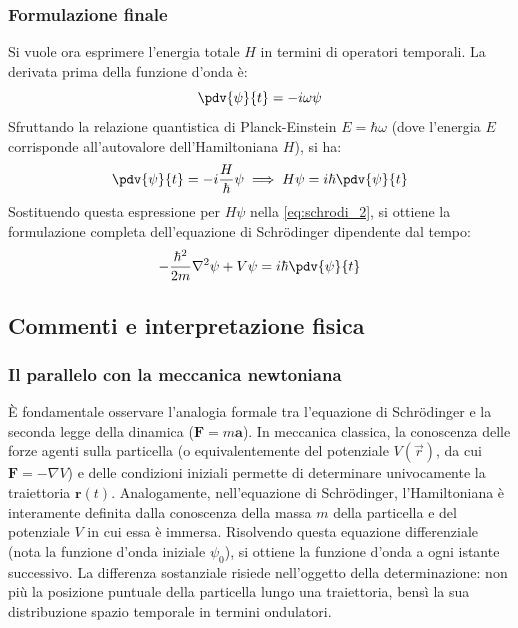 \documentclass[a4paper,11pt]{report}
\begin{document}
\subsubsection{Formulazione finale}
Si vuole ora esprimere l'energia totale $H$ in termini di operatori temporali. La derivata prima della funzione d'onda è:
\begin{equation}
    \pdv{\psi}{t} = -i\omega \psi
\end{equation}
Sfruttando la relazione quantistica di Planck-Einstein $E = \hbar \omega$ (dove l'energia $E$ corrisponde all'autovalore dell'Hamiltoniana $H$), si ha:
\begin{equation}
    \pdv{\psi}{t} = -i\frac{H}{\hbar}\psi \implies H \psi = i\hbar \pdv{\psi}{t}
\end{equation}
Sostituendo questa espressione per $H\psi$ nella \eqref{eq:schrodi_2}, si ottiene la formulazione completa dell'equazione di Schrödinger dipendente dal tempo:
\begin{equation}
    -\frac{\hbar^2}{2m} \nabla^2 \psi + V\psi = i\hbar \pdv{\psi}{t}
\end{equation}

\subsection{Commenti e interpretazione fisica}

\subsubsection{Il parallelo con la meccanica newtoniana}
È fondamentale osservare l'analogia formale tra l'equazione di Schrödinger e la seconda legge della dinamica ($ \bm{F} = m\bm{a} $).
In meccanica classica, la conoscenza delle forze agenti sulla particella (o equivalentemente del potenziale $V(\vec{r})$, da cui $\bm{F} = -\nabla V$) e delle condizioni iniziali permette di determinare univocamente la traiettoria $\bm{r}(t)$.
Analogamente, nell'equazione di Schrödinger, l'Hamiltoniana è interamente definita dalla conoscenza della massa $m$ della particella e del potenziale $V$ in cui essa è immersa.
Risolvendo questa equazione differenziale (nota la funzione d'onda iniziale $\psi_0$), si ottiene la funzione d'onda a ogni istante successivo.
La differenza sostanziale risiede nell'oggetto della determinazione: non più la posizione puntuale della particella lungo una traiettoria, bensì la sua distribuzione spazio temporale in termini ondulatori.
\end{document}
